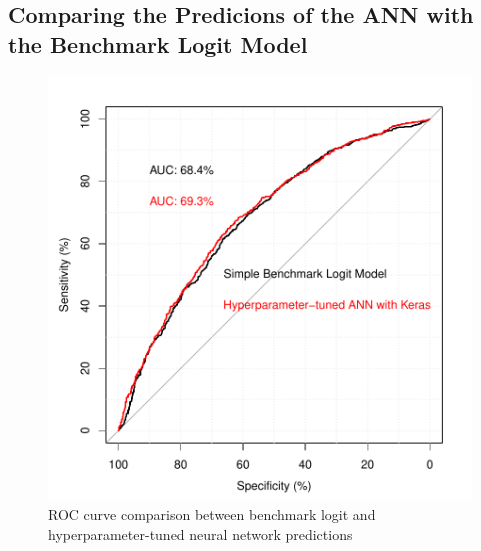 \documentclass[12pt,a4paper]{article}
\begin{document}
\subsection{Comparing the Predicions of the ANN with the Benchmark Logit Model}

\begin{figure}[ht]
	\centering
  \includegraphics[scale=0.63]{figures/roc_auc_comp.pdf}
	\caption{ROC curve comparison between benchmark logit and hyperparameter-tuned neural network predictions}
	\label{fig_roc}
\end{figure}
\end{document}

